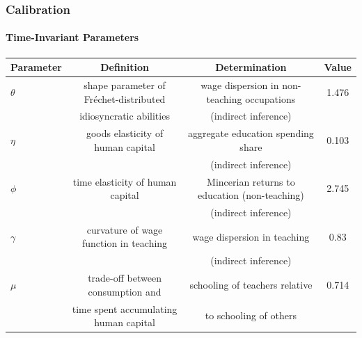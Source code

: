 \documentclass[11pt]{beamer}
\begin{document}
\begin{frame}
	\frametitle{Calibration}
	\framesubtitle{Time-Invariant Parameters}
	\tiny
	\begin{table}[h!]
		\centering
		\begin{tabular}{lccc}
			\toprule
			Parameter & Definition & Determination & Value\\
			\midrule
			$\theta$ & shape parameter of Fr\'echet-distributed & wage dispersion in non-teaching occupations & 1.476\\
			& idiosyncratic abilities & (indirect inference) &\\
			$\eta$ & goods elasticity of human capital & aggregate education spending share  & 0.103\\
			& & (indirect inference) &\\
			$\phi$ & time elasticity of human capital & Mincerian returns to education (non-teaching) & 2.745\\
			& & (indirect inference) &\\
			$\gamma$ & curvature of wage function in teaching & wage dispersion in teaching & 0.83\\
			&& (indirect inference) &\\
			$\mu$ &  trade-off between consumption and & schooling of teachers relative & 0.714\\
			& time spent accumulating human capital & to schooling of others & \\
			\bottomrule
		\end{tabular}
		\label{tab:param}
	\end{table}
\end{frame}
\end{document}
